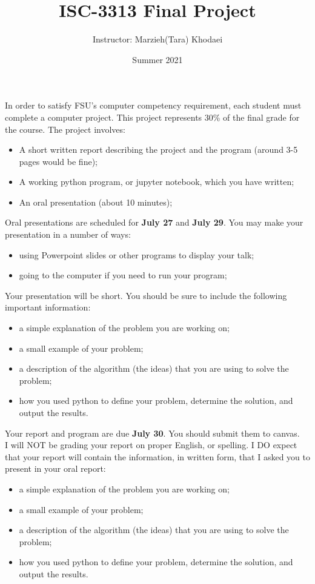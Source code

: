 \documentclass{article}
\title{ISC-3313 Final Project}
\author{Instructor: Marzieh(Tara) Khodaei}
\date{Summer 2021}
\begin{document}
\maketitle
\noindent
In order to satisfy FSU's computer competency requirement, each student must complete a computer project. This project represents 30\% of the final grade for the course. The project involves:

\begin{itemize}
    \item  A short written report describing the project and the program (around 3-5 pages would be fine);
    \item A working python program, or jupyter notebook,  which you have written;
    \item An oral presentation (about 10 minutes);
\end{itemize}

\noindent
Oral presentations are scheduled for \textbf{July 27} and \textbf{July 29}. You may make your presentation in a number of ways:
\begin{itemize}
    \item using Powerpoint slides or other programs to display your talk;
    \item going to the computer if you need to run your program;
\end{itemize}

\noindent
Your presentation will be short. You should be sure to include the following important information:

\begin{itemize}
    \item  a simple explanation of the problem you are working on;
    \item a small example of your problem;
    \item a description of the algorithm (the ideas) that you are using to solve the problem;
    \item how you used python to define your problem, determine the solution, and output the results.
\end{itemize}

\noindent
Your report and program are due \textbf{July 30}. You should submit them to canvas.\\
I will NOT be grading your report on proper English, or spelling. I DO expect that your report will contain the information, in written form, that I asked you to present in your oral report:

\begin{itemize}
    \item  a simple explanation of the problem you are working on;
    \item a small example of your problem;
    \item a description of the algorithm (the ideas) that you are using to solve the problem;
    \item how you used python to define your problem, determine the solution, and output the results.
\end{itemize}
\end{document}
